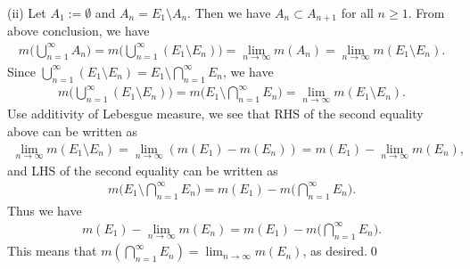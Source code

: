 \documentclass{book}
\theoremstyle{defstyle}
\theoremstyle{thmstyle}
\begin{document}
(ii) Let $A_1 := \emptyset$ and $A_n = E_1 \setminus A_n$. Then we have $A_n \subset A_{n + 1}$ for all $n \geq 1$. From above conclusion, we have
    \begin{align*}
        m\Big(\bigcup_{n = 1}^{\infty}A_n\Big)
        = m\Big(\bigcup_{n = 1}^{\infty}(E_1 \setminus E_n)\Big)
        = \lim_{n \to \infty}m(A_n)
        = \lim_{n \to \infty}m(E_1 \setminus E_n).
    \end{align*}
Since $\bigcup_{n = 1}^{\infty}(E_1 \setminus E_n) = E_1 \setminus \bigcap_{n = 1}^{\infty}E_n$, we have
    \begin{align*}
        m\Big(\bigcup_{n = 1}^{\infty}(E_1 \setminus E_n)\Big)
        = m\Big(E_1 \setminus \bigcap_{n = 1}^{\infty}E_n\Big)
        = \lim_{n \to \infty}m(E_1 \setminus E_n).
    \end{align*}
Use additivity of Lebesgue measure, we see that RHS of the second equality above can be written as
    \begin{align*}
        \lim_{n \to \infty}m(E_1 \setminus E_n)
        = \lim_{n \to \infty}(m(E_1) - m(E_n))
        = m(E_1) - \lim_{n \to \infty}m(E_n),
    \end{align*}
and LHS of the second equality can be written as
    \begin{align*}
        m\Big(E_1 \setminus \bigcap_{n = 1}^{\infty}E_n\Big)
        = m(E_1) - m\Big(\bigcap_{n = 1}^{\infty}E_n\Big).
    \end{align*}
Thus we have
    \begin{align*}
        m(E_1) - \lim_{n \to \infty}m(E_n)
        = m(E_1) - m\Big(\bigcap_{n = 1}^{\infty}E_n\Big).
    \end{align*}
This means that $m(\bigcap_{n = 1}^{\infty}E_n) = \lim_{n \to \infty}m(E_n)$, as desired.\qed
\end{document}

